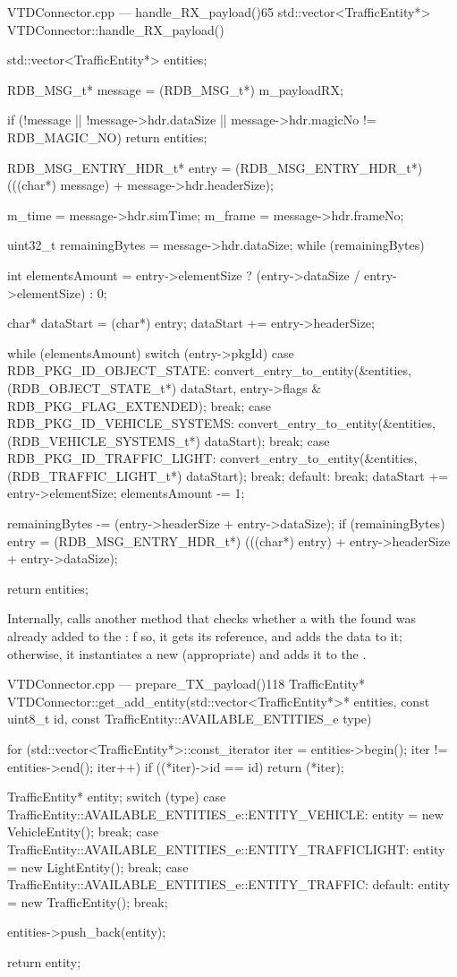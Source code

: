 \begin{codelist}{VTDConnector.cpp --- handle\_RX\_payload()}{65}
std::vector<TrafficEntity*> VTDConnector::handle_RX_payload() {
	std::vector<TrafficEntity*> entities;

	RDB_MSG_t* message = (RDB_MSG_t*) m_payloadRX;

	if (!message || !message->hdr.dataSize || message->hdr.magicNo != RDB_MAGIC_NO)
		return entities;

	RDB_MSG_ENTRY_HDR_t* entry = (RDB_MSG_ENTRY_HDR_t*) (((char*) message) + message->hdr.headerSize);

	m_time  = message->hdr.simTime;
	m_frame = message->hdr.frameNo;

	uint32_t remainingBytes = message->hdr.dataSize;
	while (remainingBytes) {
		int elementsAmount = entry->elementSize ? (entry->dataSize / entry->elementSize) : 0;

		char* dataStart = (char*) entry;
		dataStart += entry->headerSize;

		while (elementsAmount) {
			switch (entry->pkgId) {
				case RDB_PKG_ID_OBJECT_STATE:
					convert_entry_to_entity(&entities, (RDB_OBJECT_STATE_t*) dataStart, entry->flags & RDB_PKG_FLAG_EXTENDED);
					break;
				case RDB_PKG_ID_VEHICLE_SYSTEMS:
					convert_entry_to_entity(&entities, (RDB_VEHICLE_SYSTEMS_t*) dataStart);
					break;
				case RDB_PKG_ID_TRAFFIC_LIGHT:
					convert_entry_to_entity(&entities, (RDB_TRAFFIC_LIGHT_t*) dataStart);
					break;
				default:
					break;
			}
			dataStart += entry->elementSize;
			elementsAmount -= 1;
		}

		remainingBytes -= (entry->headerSize + entry->dataSize);
		if (remainingBytes)
			entry = (RDB_MSG_ENTRY_HDR_t*) (((char*) entry) + entry->headerSize + entry->dataSize);
	}

	return entities;
}
\end{codelist}

Internally,  calls another method that checks whether a  with the found  was already added to the : f so, it gets its reference, and adds the data to it; otherwise, it instantiates a new (appropriate)  and adds it to the .

\begin{codelist}{VTDConnector.cpp --- prepare\_TX\_payload()}{118}
TrafficEntity* VTDConnector::get_add_entity(std::vector<TrafficEntity*>* entities, const uint8_t id, const TrafficEntity::AVAILABLE_ENTITIES_e type) {
	for (std::vector<TrafficEntity*>::const_iterator iter = entities->begin(); iter != entities->end(); iter++)
		if ((*iter)->id == id)
			return (*iter);

	TrafficEntity* entity;
	switch (type) {
		case TrafficEntity::AVAILABLE_ENTITIES_e::ENTITY_VEHICLE:
			entity = new VehicleEntity();
			break;
		case TrafficEntity::AVAILABLE_ENTITIES_e::ENTITY_TRAFFICLIGHT:
			entity = new LightEntity();
			break;
		case TrafficEntity::AVAILABLE_ENTITIES_e::ENTITY_TRAFFIC:
		default:
			entity = new TrafficEntity();
			break;
	}

	entities->push_back(entity);

	return entity;
}
\end{codelist}

